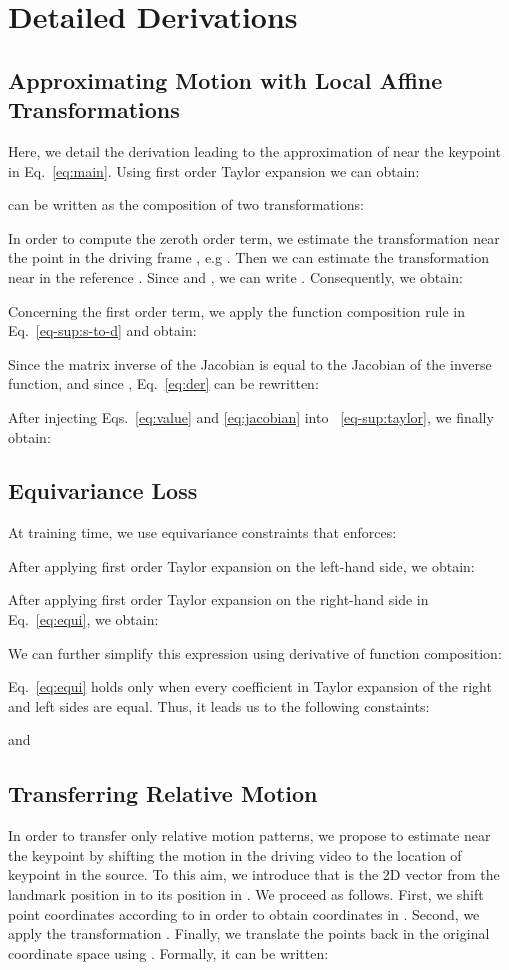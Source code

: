 \documentclass{article}
\begin{document}
\section{Detailed Derivations}
\label{sec:deri}
\subsection{Approximating Motion with Local Affine Transformations}
Here, we detail the derivation leading to the approximation of   near the keypoint  in Eq.~\eqref{eq:main}. 
Using first order Taylor expansion we can obtain:


 can be written as the composition of two transformations:


In order to compute the zeroth order term,  we estimate the transformation  near the point  in the driving frame , e.g . Then we can estimate the transformation  near  in the reference . 
Since  and , we can write . Consequently, we obtain:



Concerning the first order term, we apply the function composition rule in Eq.~\eqref{eq-sup:s-to-d} and obtain:


Since the matrix inverse of the Jacobian is equal to the Jacobian of the inverse function, and since , Eq.~\eqref{eq:der} can be rewritten:


After injecting Eqs.~\eqref{eq:value} and \eqref{eq:jacobian} into ~\eqref{eq-sup:taylor}, we finally obtain:


\subsection{Equivariance Loss}
At training time, we use equivariance constraints that enforces:


After applying first order Taylor expansion on the left-hand side, we obtain:

 After applying first order Taylor expansion on the right-hand side in Eq.~\eqref{eq:equi}, we obtain:

We can further simplify this expression using derivative of function composition:

Eq.~\eqref{eq:equi} holds only when every coefficient in Taylor expansion of the right and left sides are equal. Thus, it leads us to the following constaints:


and



\subsection{Transferring Relative Motion}
In order to transfer only relative motion patterns, we propose to estimate  near the keypoint  by shifting the motion in the driving video to the location of keypoint  in the source. To this aim, we introduce  that is the 2D vector from the landmark position  in  to its position in . We proceed as follows. First, we shift point coordinates according to  in order to obtain coordinates in . Second, we apply the transformation . Finally, we translate the points back in the original coordinate space using . Formally, it can be written:
\end{document}

